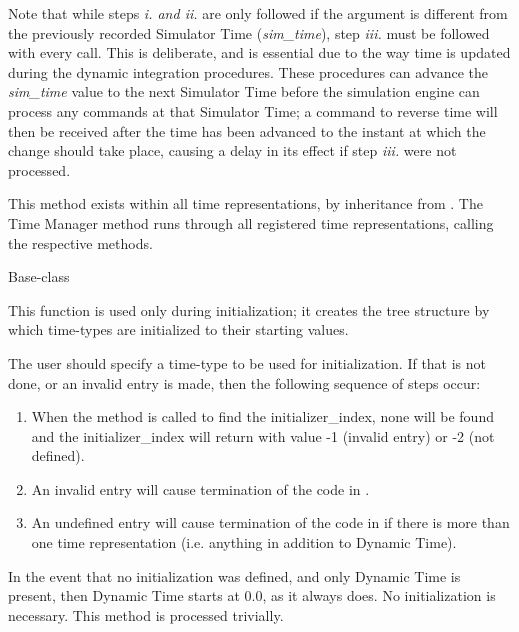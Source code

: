 {\begin{enumerate}
{\begin{enumerate}
Note that while steps \textit{i. and ii.} are only followed if the argument is
different from the previously recorded Simulator Time (\textit{sim\_time}),
step
\textit{iii.} must be followed with every call.  This is deliberate, and is
essential due to the way time is updated during the dynamic integration
procedures.  These procedures can advance the \textit{sim\_time} value to the
next Simulator Time before the simulation engine can process any commands at
that Simulator Time; a command to reverse time will then be received after the
time has been advanced to the instant at which the change should take place,
causing a delay in its effect if step \textit{iii.} were not processed.

This method exists within all time representations, by inheritance from
.  The Time Manager method runs through all registered
time
representations, calling the respective methods.
\end{enumerate}}


  \label {ref:timemanagerinit}
  Base-class


{\begin{enumerate}
\label{ref:createinittree}This function is used only during
initialization; it creates the tree structure by which time-types
are initialized to their starting values.

The user should specify a time-type to be used for initialization.  If
that is not done, or an invalid entry is made, then the following
sequence of steps occur:


\begin{enumerate}
\item When the method
is
called to find the initializer\_index, none will be found and the
initializer\_index will return with value -1 (invalid entry) or -2 (not
defined).
\item An invalid entry will cause termination of the code in
.
\item An undefined entry will cause termination of the code in
if there is more than one time
representation (i.e. anything in addition to Dynamic Time).
\end{enumerate}

\bigskip
In the event that no initialization was defined, and only Dynamic Time
is present, then Dynamic Time starts at 0.0, as it always does. No
initialization is necessary.  This method is processed trivially.


\end{enumerate}}
\end{enumerate}}
